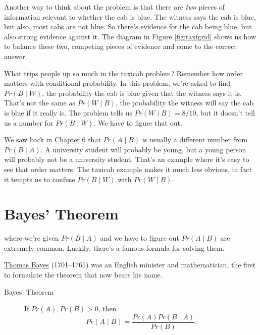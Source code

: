 \documentclass[justified]{tufte-book}
\newcommand{\given}{\mid}
\newcommand{\p}{Pr}
\theoremstyle{definition}
\theoremstyle{definition}
\theoremstyle{definition}
\theoremstyle{remark}
\begin{document}
Another way to think about the problem is that there are \emph{two} pieces of information relevant to whether the cab is blue. The witness says the cab is blue, but also, most cabs are not blue. So there's evidence for the cab being blue, but also strong evidence against it. The diagram in Figure \ref{fig:taxigrid} shows us how to balance these two, competing pieces of evidence and come to the correct answer.

What trips people up so much in the taxicab problem? Remember how order matters with conditional probability. In this problem, we're asked to find \(\p(B \given W)\), the probability the cab is blue given that the witness says it is. That's not the same as \(\p(W \given B)\), the probability the witness will say the cab is blue if it really is. The problem tells us \(\p(W \given B) = 8/10\), but it doesn't tell us a number for \(\p(B \given W)\). We have to figure that out.

We saw back in \protect\hyperlink{conditional-probability}{Chapter 6} that \(\p(A \given B)\) is usually a different number from \(\p(B \given A)\). A university student will probably be young, but a young person will probably not be a university student. That's an example where it's easy to see that order matters. The taxicab example makes it much less obvious, in fact it tempts us to confuse \(\p(B \given W)\) with \(\p(W \given B)\).

\hypertarget{bayes-theorem}{%
\section{Bayes' Theorem}\label{bayes-theorem}}

 where we're given \(\p(B \given A)\) and we have to figure out \(\p(A \given B)\) are extremely common. Luckily, there's a famous formula for solving them.

\begin{marginfigure}
\href{https://en.wikipedia.org/wiki/Thomas_Bayes}{Thomas Bayes}
(1701--1761) was an English minister and mathematician, the first to
formulate the theorem that now bears his name.
\end{marginfigure}

\begin{description}
\item[Bayes' Theorem]
If \(\p(A),\p(B)>0\), then
\[ \p(A \given B) = \frac{\p(A)\p(B \given A)}{\p(B)}. \]
\end{description}
\end{document}
